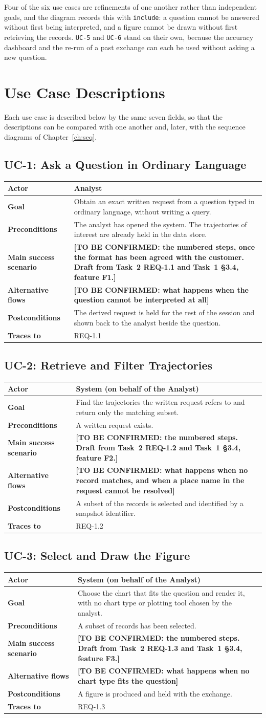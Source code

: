 \documentclass[12pt,a4paper]{report}
\makeatletter
\newcommand{\tbd}[1]{{\color{red}\textbf{[TO BE CONFIRMED: #1]}}}
\newcommand{\ucdesc}[7]{%
  \begin{table}[H]
  \centering
  {\small
  \setlength{\tabcolsep}{4.5pt}
  \begin{tabular}{@{}>{\bfseries}p{2.9cm} >{\raggedright\arraybackslash}p{12.2cm}@{}}
    \toprule[1.5pt]
    Actor & #1 \\ \midrule
    Goal & #2 \\ \midrule
    Preconditions & #3 \\ \midrule
    Main success scenario & #4 \\ \midrule
    Alternative flows & #5 \\ \midrule
    Postconditions & #6 \\ \midrule
    Traces to & #7 \\
    \bottomrule[1.5pt]
  \end{tabular}}
  \end{table}
}
\makeatother
\begin{document}
Four of the six use cases are refinements of one another rather than
independent goals, and the diagram records this with \texttt{include}: a
question cannot be answered without first being interpreted, and a figure
cannot be drawn without first retrieving the records. \texttt{UC-5} and
\texttt{UC-6} stand on their own, because the accuracy dashboard and the
re-run of a past exchange can each be used without asking a new question.

\section{Use Case Descriptions}
\label{sec:uc-desc}

Each use case is described below by the same seven fields, so that the
descriptions can be compared with one another and, later, with the sequence
diagrams of Chapter~\ref{ch:seq}.

\subsection{UC-1: Ask a Question in Ordinary Language}
\label{uc:1}
\ucdesc{Analyst}
  {Obtain an exact written request from a question typed in ordinary
   language, without writing a query.}
  {The analyst has opened the system. The trajectories of interest are
   already held in the data store.}
  {\tbd{the numbered steps, once the format has been agreed with the
   customer. Draft from Task~2 REQ-1.1 and Task~1 \S3.4, feature F1.}}
  {\tbd{what happens when the question cannot be interpreted at all}}
  {The derived request is held for the rest of the session and shown back to
   the analyst beside the question.}
  {REQ-1.1}

\subsection{UC-2: Retrieve and Filter Trajectories}
\label{uc:2}
\ucdesc{System (on behalf of the Analyst)}
  {Find the trajectories the written request refers to and return only the
   matching subset.}
  {A written request exists.}
  {\tbd{the numbered steps. Draft from Task~2 REQ-1.2 and Task~1 \S3.4,
   feature F2.}}
  {\tbd{what happens when no record matches, and when a place name in the
   request cannot be resolved}}
  {A subset of the records is selected and identified by a snapshot
   identifier.}
  {REQ-1.2}

\subsection{UC-3: Select and Draw the Figure}
\label{uc:3}
\ucdesc{System (on behalf of the Analyst)}
  {Choose the chart that fits the question and render it, with no chart type
   or plotting tool chosen by the analyst.}
  {A subset of records has been selected.}
  {\tbd{the numbered steps. Draft from Task~2 REQ-1.3 and Task~1 \S3.4,
   feature F3.}}
  {\tbd{what happens when no chart type fits the question}}
  {A figure is produced and held with the exchange.}
  {REQ-1.3}
\end{document}

